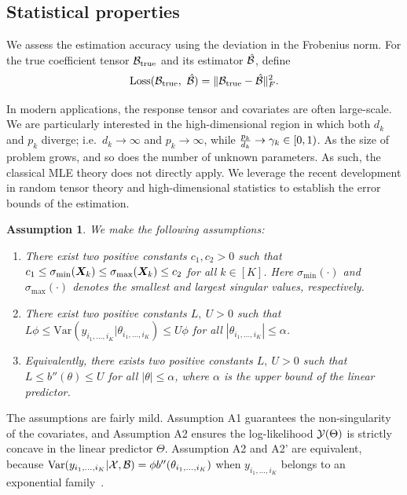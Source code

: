 \documentclass[12pt]{article}
\theoremstyle{plain}
\newtheorem{assumption}{Assumption}
\theoremstyle{definition}
\begin{document}
\subsection{Statistical properties}\label{subsec:statprob}
We assess the estimation accuracy using the deviation in the Frobenius norm. For the true coefficient tensor $\mathcal{B}_{\text{true}}$ and its estimator $\hat {\mathcal{B}}$, define
\[
\text{Loss}(\mathcal{B}_{\text{true}},\ \hat {\mathcal{B}})=\lVert\mathcal{B}_{\text{true}}- \hat {\mathcal{B}}\rVert_F^2.
\]

In modern applications, the response tensor and covariates are often large-scale. We are particularly interested in the high-dimensional region in which both $d_k$ and $p_k$ diverge; i.e.\ $d_k\to \infty$ and $p_k\to\infty$, while ${p_k\over d_k} \to \gamma_k \in[0,1)$. As the size of problem grows, and so does the number of unknown parameters. As such, the classical MLE theory does not directly apply. We leverage the recent development in random tensor theory and high-dimensional statistics to establish the error bounds of the estimation. 

  
  
\begin{assumption}\label{ass}We make the following assumptions:
\begin{enumerate}
\item [A1.] There exist two positive constants $c_1, c_2>0$ such that $c_1\leq \sigma_{\min}(\bm X_k)\leq  \sigma_{\max}(\bm X_k)\leq c_2$ for all $k\in[K]$. Here $\sigma_{\text{min}}(\cdot)$ and $\sigma_{\text{max}}(\cdot)$ denotes the smallest and largest singular values, respectively.
\item [A2.] There exist two positive constants $L,\ U>0$ such that $L\phi \leq \text{Var}(y_{i_1,\ldots,i_K}|\theta_{i_1,\ldots,i_K})\leq U\phi $ for all $|\theta_{i_1,\ldots,i_K}|\leq \alpha$.
\item[A2'.] Equivalently, there exists two positive constants $L,\ U>0$ such that $L\leq b''(\theta) \leq U$ for all $|\theta|\leq \alpha$, where $\alpha$ is the upper bound of the linear predictor. 

\end{enumerate}
\end{assumption}
The assumptions are fairly mild. Assumption A1 guarantees the non-singularity of the covariates, and Assumption A2 ensures the log-likelihood $\mathcal{Y}(\Theta)$ is strictly concave in the linear predictor $\Theta$. Assumption A2 and A2' are equivalent, because $\text{Var}(y_{i_1,\ldots,i_K}|\mathcal{X},\mathcal{B})=\phi b''(\theta_{i_1,\ldots,i_K})$ when $y_{i_1,\ldots,i_K}$ belongs to an exponential family~\citep{mccullagh1989generalized}. 
\end{document}

